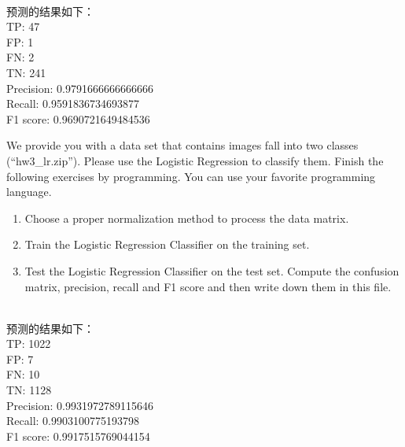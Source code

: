 \documentclass[11pt,letter,notitlepage]{article}
\begin{document}
\begin{solution}
	\heiti
	\ \\
	预测的结果如下：\\
	TP: 47\\
	FP: 1\\
	FN: 2\\
	TN: 241\\
	Precision: 0.9791666666666666\\
	Recall: 0.9591836734693877\\
	F1 score: 0.9690721649484536\\
\end{solution}

\newpage
\begin{exercise}
We provide you with a data set that contains images fall into two classes (``hw3\_lr.zip''). Please use the Logistic Regression to classify them.
Finish the following exercises by programming. You can use your favorite programming language.
\begin{enumerate}
\item Choose a proper normalization method to process the data matrix.
\item Train the Logistic Regression Classifier on the training set.
\item Test the Logistic Regression Classifier on the test set. Compute the confusion matrix, precision, recall and F1 score and then write down them in this file.
\end{enumerate}
\end{exercise}

\begin{solution}
	\heiti
	\ \\
	预测的结果如下：\\
	TP: 1022\\
	FP: 7\\
	FN: 10\\
	TN: 1128\\
	Precision: 0.9931972789115646\\
	Recall: 0.9903100775193798\\
	F1 score: 0.9917515769044154\\
	

\end{solution}





\end{document}
